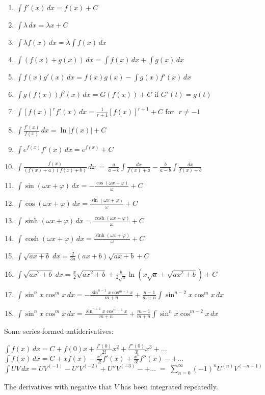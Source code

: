 \documentclass[12pt]{article}
\theoremstyle{definition}
\newcommand{\ds}{\displaystyle}
\begin{document}
\begin{enumerate}
\item $\ds \int f'(x)\,dx = f(x)+C$
\item $\ds \int\lambda\,dx = \lambda x+C$
\item $\ds \int\lambda f(x)\,dx = \lambda\int f(x)\,dx$
\item $\ds \int(f(x)+g(x))\,dx = \int f(x)\,dx+\int g(x)\,dx$
\item $\ds \int f(x)g'(x)\,dx = f(x)g(x)-\int g(x)f'(x)\,dx$
\item $\ds \int g(f(x))f'(x)\,dx = G(f(x))+C$\;\; if\;\; $G'(t) = g(t)$
\item $\ds \int [f(x)]^rf'(x)\,dx = \frac{1}{r\!+\!1}[f(x)]^{r+1}+C$\;\; for\,\, $r \neq -1$
\item $\ds \int \frac{f'(x)}{f(x)}\,dx = \ln|f(x)|+C$
\item $\ds \int e^{f(x)}f'(x)\,dx = e^{f(x)}+C$
\item $\ds \int \!\frac{f(x)}{(f(x)\!+\!a)(f(x)\!+\!b)}\,dx \,=\, 
\frac{a}{a\!-\!b}\int\!\frac{dx}{f(x)\!+\!a}-\frac{b}{a\!-\!b}\int\!\frac{dx}{f(x)\!+\!b}$
\item $\ds \int \sin(\omega x+\varphi)\,dx = -\frac{\cos(\omega x+\varphi)}{\omega}+C$
\item $\ds \int \cos(\omega x+\varphi)\,dx = \frac{\sin(\omega x+\varphi)}{\omega}+C$
\item $\ds \int \sinh(\omega x+\varphi)\,dx = \frac{\cosh(\omega x+\varphi)}{\omega}+C$
\item $\ds \int \cosh(\omega x+\varphi)\,dx = \frac{\sinh(\omega x+\varphi)}{\omega}+C$
\item $\ds \int \sqrt{ax\!+\!b}\;dx = \frac{2}{3a}(ax\!+\!b)\sqrt{ax\!+\!b}+C$
\item $\ds \int \sqrt{ax^2\!+\!b}\;dx = \frac{x}{2}\sqrt{ax^2\!+\!b}+\frac{b}{2\sqrt{a}}\ln(x\sqrt{a}+\sqrt{ax^2\!+\!b})+C$
\item $\displaystyle \int \sin^n x \cos^m x \, dx = -\frac{\sin^{n-1} x \cos^{m+1} x}{m+n} + \frac{n-1}{m+n} \int \sin^{n-2}x \cos^m x \, dx$
\item $\displaystyle \int \sin^n x \cos^m x \, dx = \frac{\sin^{n+1} x \cos^{m-1} x}{m+n} + \frac{m-1}{m+n} \int \sin^n x \cos^{m-2} x \, dx$\\
\end{enumerate}

Some series-formed antiderivatives:

$\ds \int f(x)\,dx = C+f(0)x+\frac{f'(0)}{2!}x^2+\frac{f''(0)}{3!}x^3+\ldots$\\
$\ds \int f(x)\,dx = C+xf(x)-\frac{x^2}{2!}f'(x)+\frac{x^3}{3!}f''(x)-+\ldots$\\
$\ds \int UV\,dx = UV^{(-1)}-U'V^{(-2)}+U''V^{(-3)}-+\ldots \;=\; \sum_{n=0}^\infty (-1)^n U^{(n)}V^{(-n-1)}$

The derivatives with negative   that $V$ has been integrated repeatedly.

\end{document}
